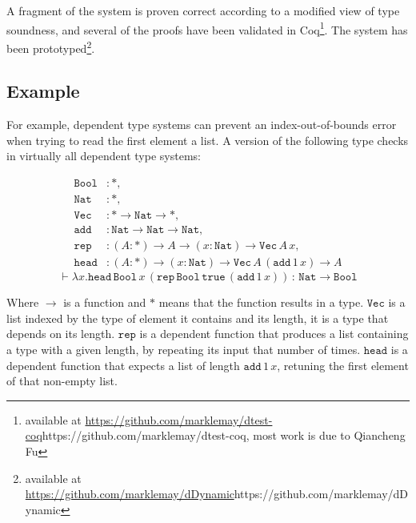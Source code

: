 A fragment of the system is proven correct according to a modified view of type soundness, and several of the proofs have been validated in Coq\footnote{
available at \url{https://github.com/marklemay/dtest-coq}{https://github.com/marklemay/dtest-coq}, most work is due to Qiancheng Fu}.
The system has been prototyped\footnote{available at \url{https://github.com/marklemay/dDynamic}{https://github.com/marklemay/dDynamic}}.


\subsection{Example}

For example, dependent type systems can prevent an index-out-of-bounds error when trying to read the first element a list.
A version of the following type checks in virtually all dependent type systems:


\begin{align*}
\mathtt{Bool} & :*,\\
\mathtt{Nat} & :*,\\
\mathtt{Vec} & :*\rightarrow\mathtt{Nat}\rightarrow*,\\
\mathtt{add} & :\mathtt{Nat}\rightarrow\mathtt{Nat}\rightarrow\mathtt{Nat},\\
\mathtt{rep} & :\left(A:*\right)\rightarrow A\rightarrow\left(x:\mathtt{Nat}\right)\rightarrow\mathtt{Vec\,}A\,x,\\
\mathtt{head} & :\left(A:*\right)\rightarrow\left(x:\mathtt{Nat}\right)\rightarrow\mathtt{Vec}\,A\,\left(\mathtt{add}\,1\,x\right)\rightarrow A
\end{align*}
\[
\vdash\lambda x.\mathtt{head}\,\mathtt{Bool}\,x\,\left(\mathtt{rep}\,\mathtt{Bool}\,\mathtt{true}\,\left(\mathtt{add}\,1\,x\right)\right)\,:\,\mathtt{Nat}\rightarrow\mathtt{Bool}
\]


Where $\rightarrow$ is a function and $*$ means that the function results in a type.
$\mathtt{Vec}$ is a list indexed by the type of element it contains and its length, it is a type that depends on its length.
$\mathtt{rep}$ is a dependent function that produces a list containing a type with a given length, by repeating its input that number of times.
$\mathtt{head}$ is a dependent function that expects a list of length $\mathtt{add}\,1\,x$, retuning the first element of that non-empty list. 

